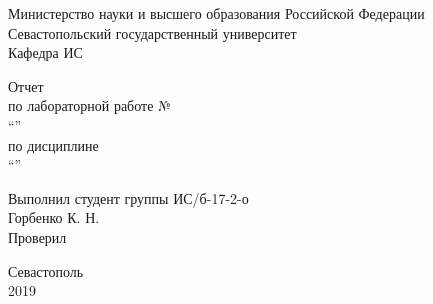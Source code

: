 \begin{titlepage}
    
    \thispagestyle{empty}
    
    \begin{center}
        
        Министерство науки и высшего образования Российской Федерации \\
        Севастопольский государственный университет \\
        Кафедра ИС
        
        \vfill

        Отчет \\
        по лабораторной работе №\mylabnumber \\
        \enquote{\mylabtitle} \\
        по дисциплине \\
        \enquote{\MakeTextUppercase{\mysubject}}

    \end{center}

    \vspace{1cm}

    \noindent\hspace{7.5cm} Выполнил студент группы ИС/б-17-2-о \\
    \null\hspace{7.5cm} Горбенко К. Н. \\
    \null\hspace{7.5cm} Проверил \\
    \null\hspace{7.5cm} \mylecturer

    \vfill

    \begin{center}
        Севастополь \\
        2019
    \end{center}

\end{titlepage}